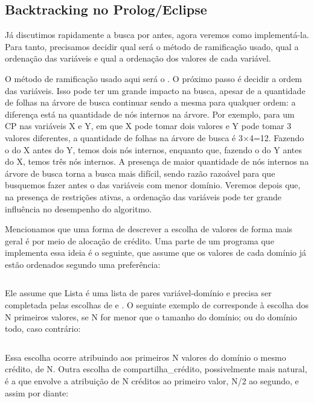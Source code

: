 \subsection{Backtracking no Prolog/Eclipse}

Já discutimos rapidamente a busca por  antes, agora veremos como implementá-la. Para tanto, precisamos decidir qual será o método de ramificação usado, qual a ordenação das variáveis e qual a ordenação dos valores de cada variável.

O método de ramificação usado aqui será o . O próximo passo é decidir a ordem das variáveis. Isso pode ter um grande impacto na busca, apesar de a quantidade de folhas na árvore de busca continuar sendo a mesma para qualquer ordem: a diferença está na quantidade de nós internos na árvore. Por exemplo, para um CP nas variáveis X e Y, em que X pode tomar dois valores e Y pode tomar 3 valores diferentes, a quantidade de folhas na árvore de busca é 3$\times$4=12. Fazendo o
do X antes do Y, temos dois nós internos, enquanto que, fazendo o  do Y antes do X, temos três nós internos. A presença de maior quantidade de nós internos na árvore de busca torna a busca mais difícil, sendo razão razoável para que busquemos fazer antes o  das variáveis com menor domínio. Veremos depois que, na presença de restrições ativas, a ordenação das variáveis pode ter grande influência no desempenho do algoritmo.

Mencionamos que uma forma de descrever a escolha de valores de forma mais geral é por meio de alocação de crédito. Uma parte de um programa que implementa essa ideia é o seguinte, que assume que os valores de cada domínio já estão ordenados segundo uma preferência:

\inputminted{prolog}{../Exemplos/Cap8/prog2_busca2.pl}

Ele assume que Lista é uma lista de pares variável-domínio e precisa ser completada pelas escolhas
de  e . O seguinte exemplo de  corresponde à escolha dos N primeiros valores, se N for menor
que o tamanho do domínio; ou do domínio todo,
caso contrário:

\inputminted{prolog}{../Exemplos/Cap8/prog3_partilha.pl}

Essa escolha ocorre atribuindo aos primeiros N valores do domínio o mesmo crédito, de N. Outra escolha de compartilha\_crédito, possivelmente mais natural, é a que envolve a atribuição de N créditos ao primeiro valor, N/2 ao segundo, e assim por diante:

